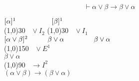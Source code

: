 \documentclass{article}
\theoremstyle{break}
\theoremstyle{break}
\theoremstyle{break}
\theoremstyle{break}
\begin{document}
\begin{figure}[H]
    \begin{exercise}
        \[
            \vdash \alpha \vee \beta \to \beta \vee \alpha
        \] 
        \begin{center}
            \hspace{2.2cm}\( [\alpha]^1 \hspace{1.8cm} [\beta]^1 \) \\
            \hspace{3cm}\line(1,0){30}\(\;\;\; \vee I_2 \) \hspace{0.2cm}\line(1,0){30}\(\;\;\; \vee I_1 \)\\  
            \( [\alpha \vee \beta]^2 \hspace{1cm} \beta \vee \alpha \hspace{1.5cm} \beta \vee \alpha \) \\
            \hspace{0.9cm}\line(1,0){150}\(\;\;\; \vee E^1 \)\\  
            \( \beta \vee \alpha \)\\
            \hspace{0.9cm}\line(1,0){90}\(\;\;\; \to I^2 \)\\  
            \( (\alpha \vee \beta) \to (\beta \vee \alpha) \) 
        \end{center}

    \end{exercise}
\end{figure}
\end{document}
